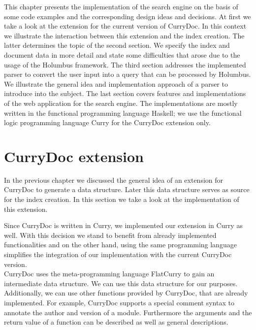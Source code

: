 \documentclass[%
	pdftex,%
	a4paper,%
	oneside,%
	chapterprefix,%
	headsepline,%
	12pt%
]{scrbook}
\begin{document}
This chapter presents the implementation of the search engine on the
basis of some code examples and the corresponding design ideas and
decisions. %
At first we take a look at the extension for the current version of
CurryDoc. %
In this context we illustrate the interaction between this extension
and the index creation. %
The latter determines the topic of the second section. %
We specify the index and document data in more detail and state some
difficulties that arose due to the usage of the Holumbus framework. %
The third section addresses the implemented parser to convert the user
input into a query that can be processed by Holumbus. %
We illustrate the general idea and implementation approach of a parser
to introduce into the subject. %
The last section covers features and implementations of the web
application for the search engine. %
The implementations are mostly written in the functional programming
language Haskell; we use the functional logic programming language
Curry for the CurryDoc extension only.\\


\section{CurryDoc extension}\label{implementation:currydoc}

In the previous chapter we discussed the general idea of an extension
for CurryDoc to generate a data structure. %
Later this data structure serves as source for the index creation.%
In this section we take a look at the implementation of this
extension.

Since CurryDoc is written in Curry, we implemented our extension in
Curry as well. %
With this decision we stand to benefit from already implemented
functionalities and on the other hand, using the same programming
language simplifies the integration of our implementation with the
current CurryDoc version.\\

CurryDoc uses the meta-programming language FlatCurry to gain an
intermediate data structure. %
We can use this data structure for our purposes. %
Additionally, we can use other functions provided by CurryDoc, that
are already implemented. %
For example, CurryDoc supports a special comment syntax to annotate
the author and version of a module. %
Furthermore the arguments and the return value of a function can be
described as well as general descriptions.
\end{document}
